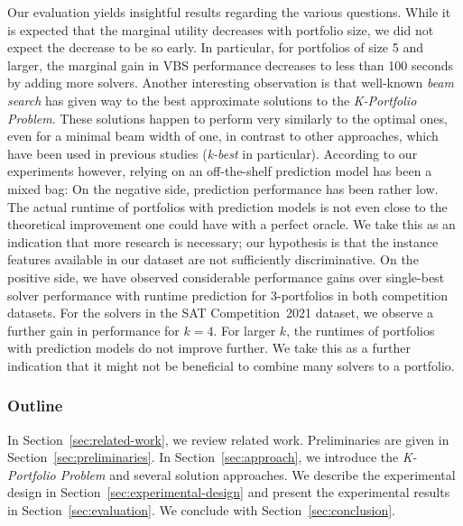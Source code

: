 \documentclass[conference]{IEEEtran}
\begin{document}
Our evaluation yields insightful results regarding the various questions. 
While it is expected that the marginal utility decreases with portfolio size, we did not expect the decrease to be so early. 
In particular, for portfolios of size 5 and larger, the marginal gain in VBS performance decreases to less than 100 seconds by adding more solvers.  
Another interesting observation is that well-known \emph{beam search} has given way to the best approximate solutions to the \emph{K-Portfolio Problem}. 
These solutions happen to perform very similarly to the optimal ones, even for a minimal beam width of one, in contrast to other approaches, which have been used in previous studies (\emph{k-best} in particular). 
According to our experiments however, relying on an off-the-shelf prediction model has been a mixed bag:
On the negative side, prediction performance has been rather low. 
The actual runtime of portfolios with prediction models is not even close to the theoretical improvement one could have with a perfect oracle.
We take this as an indication that more research is necessary; our hypothesis is that the instance features available in our dataset are not sufficiently discriminative. 
On the positive side, we have observed considerable performance gains over single-best solver performance with runtime prediction for $3$-portfolios in both competition datasets. 
For the solvers in the SAT Competition~2021 dataset, we observe a further gain in performance for $k = 4$. 
For larger $k$, the runtimes of portfolios with prediction models do not improve further. 
We take this as a further indication that it might not be beneficial to combine many solvers to a portfolio. 

\subsubsection{Outline}

In Section~\ref{sec:related-work}, we review related work. 
Preliminaries are given in Section~\ref{sec:preliminaries}. 
In Section~\ref{sec:approach}, we introduce the \emph{K-Portfolio Problem} and several solution approaches. 
We describe the experimental design in Section~\ref{sec:experimental-design} and present the experimental results in Section~\ref{sec:evaluation}. 
We conclude with Section~\ref{sec:conclusion}. 
\end{document}
